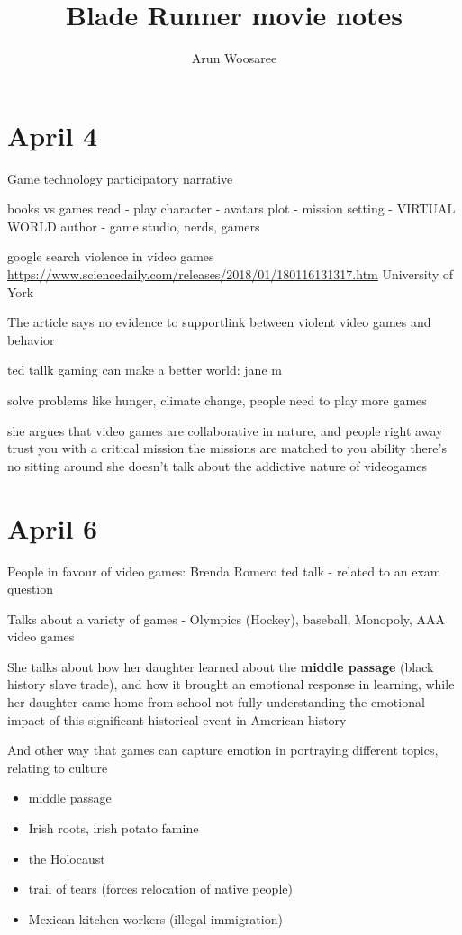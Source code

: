 \documentclass{article}
\title{Blade Runner movie notes}
\author{Arun Woosaree}
\begin{document}
\section{April 4}
Game technology participatory narrative

books vs games
read - play
character - avatars
plot - mission
setting - VIRTUAL WORLD
author - game studio, nerds, gamers


google search violence in video games
\url{https://www.sciencedaily.com/releases/2018/01/180116131317.htm}
University of York

The article says no evidence to supportlink between violent video games and behavior


ted tallk gaming can make a better world:
jane m

solve problems like hunger, climate change,
people need to play more games

she argues that video games are collaborative in nature,
and people right away trust you with a critical mission
the missions are matched to you ability
there's no sitting around
she doesn't talk about the addictive nature of videogames

\section{April 6}
People in favour of video games:
Brenda Romero ted talk - related to an exam question

Talks about a variety of games - Olympics (Hockey), baseball, Monopoly, AAA video games

She talks about how her daughter learned about the \textbf{middle passage} (black history slave trade),
and how it brought an emotional response in learning, while her daughter came home from school
not fully understanding the emotional impact of this significant historical event in American history

And other way that games can capture emotion in portraying different topics, relating to culture

\begin{itemize}
 \item middle passage
 \item Irish roots, irish potato famine
 \item the Holocaust
 \item trail of tears (forces relocation of native people)
 \item Mexican kitchen workers (illegal immigration)
\end{itemize}
\end{document}
